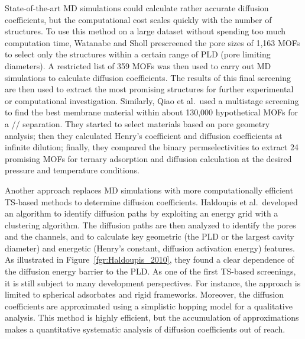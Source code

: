 \documentclass[main.tex]{subfiles}
\begin{document}
State-of-the-art MD simulations could calculate rather accurate diffusion coefficients, but the computational cost scales quickly with the number of structures. To use this method on a large dataset without spending too much computation time, Watanabe and Sholl prescreened the pore sizes of 1,163 MOFs to select only the structures within a certain range of PLD (pore limiting diameters).\autocite{Watanabe_2012} A restricted list of 359 MOFs was then used to carry out MD simulations to calculate diffusion coefficients. The results of this final screening are then used to extract the most promising structures for further experimental or computational investigation. Similarly, Qiao et al.\ used a multistage screening to find the best membrane material within about 130,000 hypothetical MOFs for a // separation.\autocite{Qiao_2016} They started to select materials based on pore geometry analysis; then they calculated Henry's coefficient and diffusion coefficients at infinite dilution; finally, they compared the binary permselectivities to extract 24 promising MOFs for ternary adsorption and diffusion calculation at the desired pressure and temperature conditions.

Another approach replaces MD simulations with more computationally efficient TS-based methods to determine diffusion coefficients.
Haldoupis et al.\ developed an algorithm to identify diffusion paths by exploiting an energy grid with a clustering algorithm. The diffusion paths are then analyzed to identify the pores and the channels, and to calculate key geometric (the PLD or the largest cavity diameter) and energetic (Henry's constant, diffusion activation energy) features.\autocite{Haldoupis_2010}
As illustrated in Figure~\ref{fgr:Haldoupis_2010}, they found a clear dependence of the diffusion energy barrier to the PLD. As one of the first TS-based screenings, it is still subject to many development perspectives. For instance, the approach is limited to spherical adsorbates and rigid frameworks. Moreover, the diffusion coefficients are approximated using a simplistic hopping model for a qualitative analysis. This method is highly efficient, but the accumulation of approximations makes a quantitative systematic analysis of diffusion coefficients out of reach.
\end{document}
